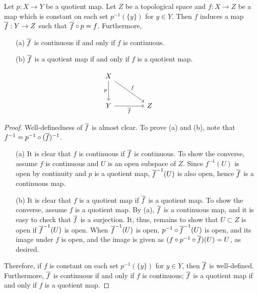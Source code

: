 \begin{thm}
    Let $p: X\rightarrow Y$ be a quotient map.
    Let $Z$ be a topological space and $f: X\rightarrow Z$ be a map which is constant on each set $p^{-1}(\{y\})$ for $y\in Y$.
    Then $f$ induces a map $\overline{f}: Y\rightarrow Z$ such that $\overline{f}\circ p=f$.
    Furthermore,
    \begin{enumerate}
        \item[(a)]
        {
            $\overline{f}$ is continuous if and only if $f$ is continuous.
        }
        \item[(b)]
        {
            $\overline{f}$ is a quotient map if and only if $f$ is a quotient map.
        }
    \end{enumerate}
    \begin{equation*}
    \begin{tikzcd}[row sep=1.0cm, column sep=1.5cm]
        X
        \arrow[d, "p"']
        \arrow[dr, "f"]
        &\\
        Y\arrow[r, "\ol{f}"']
        &
        Z
    \end{tikzcd}
    \end{equation*}
\end{thm}
\begin{proof}
    Well-definedness of $\overline{f}$ is almost clear.
    To prove (a) and (b), note that $f^{-1}=p^{-1}\circ(\overline{f})^{-1}$.
    \begin{enumerate}
        \item[(a)]
        {
            It is clear that $f$ is continuous if $\overline{f}$ is continuous.
            To show the converse, assume $f$ is continuous and $U$ is an open subspace of $Z$.
            Since $f^{-1}(U)$ is open by continuity and $p$ is a quotient map, $\overline{f}^{-1}(U)$ is also open, hence $\overline{f}$ is a continuous map.
        }
        \item[(b)]
        {
            It is clear that $f$ is a quotient map if $\overline{f}$ is a quotient map.
            To show the converse, assume $f$ is a quotient map.
            By (a), $\overline{f}$ is a continuous map, and it is easy to check that $\overline{f}$ is a surjection.
            It, thus, remains to show that $U\subset Z$ is open if $\overline{f}^{-1}(U)$ is open.
            When $\overline{f}^{-1}(U)$ is open, $p^{-1}\circ\overline{f}^{-1}(U)$ is open, and its image under $f$ is open, and the image is given as $(f\circ p^{-1}\circ\overline{f})(U)=U$, as desired.
        }
    \end{enumerate}
    Therefore, if $f$ is constant on each set $p^{-1}(\{y\})$ for $y\in Y$, then $\overline{f}$ is well-defined.
    Furthermore, $\overline{f}$ is continuous if and only if $f$ is continuous; $\overline{f}$ is a quotient map if and only if $f$ is a quotient map.
\end{proof}

